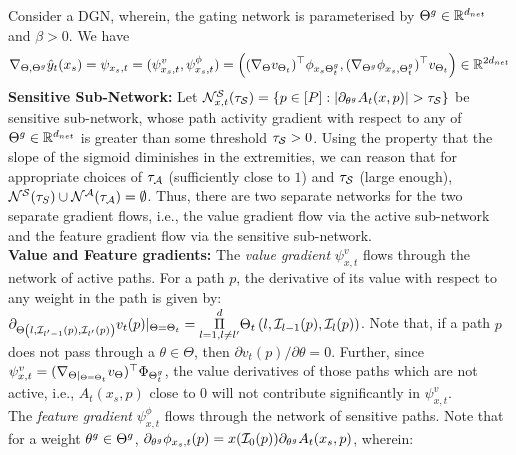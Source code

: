 Consider a DGN, wherein, the gating network is parameterised by $\Tg\inrdnet$ and $\beta>0$.  We have 
\begin{align}\label{eq:twin}\nabla_{\Theta,\Tg}\hat{y}_t(x_s)=\psi_{x_s,t}=(\psi^v_{x_s,t}, \psi^{\phi}_{x_s,t})=\left((\nabla_{\Theta}v_{\Theta_t})^\top \phi_{x_s\Tg_t}, (\nabla_{\Tg}\phi_{x_s,\Tg_t})^\top v_{\Theta_t}\right)\in \R^{2d_{net}}
\end{align}
\textbf{Sensitive Sub-Network:} Let $\N^{\S}_{x,t}(\tau_{\S})=\{p\in[P]: |\partial_{\tg} A_t(x,p)|>\tau_{\S}\}$ be sensitive sub-network, whose path activity gradient with respect to any of $\Tg\inrdnet$ is greater than some threshold $\tau_{\S}>0$. Using the property that the slope of the sigmoid diminishes in the extremities, we can reason that for appropriate choices of $\tau_{\A}$ (sufficiently close to $1$) and $\tau_{\S}$ (large enough), $\N^{\S}(\tau_{S})\cup \N^{\A}(\tau_{\A})=\emptyset$. Thus, there are two separate networks for the two separate gradient flows, i.e., the value gradient flow via the active sub-network and the feature gradient flow via the sensitive sub-network.\\
\textbf{Value and Feature gradients:} The \emph{value gradient}  $\psi^v_{x,t}$ flows through the network of active paths. For a path $p$, the derivative of its value with respect to any weight in the path is given by:
${\partial_{\Theta\left(l,\I_{l'-1}(p),\I_{l'}(p)\right)} v_t(p)}|_{\Theta=\Theta_t}= {\underset{l=1,l\neq l'}{\overset{d}{\Pi}}} \Theta_t\left(l,\I_{l-1}(p),\I_{l}(p)\right)
$.
Note that, if a path $p$ does not pass through a $\theta\in\Theta$, then ${\partial v_t(p)}/{\partial \theta}=0$. Further, since $\psi^v_{x,t}=(\nabla_{\Theta|_{\Theta=\Theta_t}}v_{\Theta})^\top \Phi_{\Tg_t}$, the value derivatives of those paths which are not active, i.e., $A_t(x_s,p)$ close to $0$ will not contribute significantly in $\psi^v_{x,t}$.\\
The \emph{feature gradient}  $\psi^{\phi}_{x,t}$ flows through the network of sensitive paths. Note that for a weight $\tg\in \Tg$, $\partial_{\tg} \phi_{x_s,t}(p) = x(\I_0(p))\partial_{\tg} A_t(x_s,p)$, wherein:
